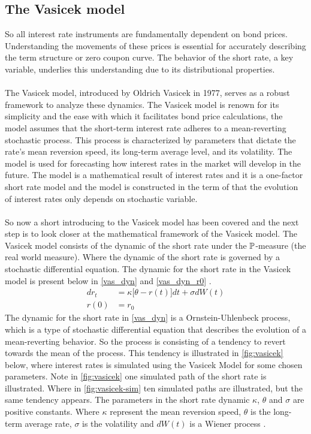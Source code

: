 \subsection{The Vasicek model}
So all interest rate instruments are fundamentally dependent on bond prices. Understanding the movements of 
these prices is essential for accurately describing the term structure or zero coupon curve. The behavior 
of the short rate, a key variable, underlies this understanding due to its distributional properties.
\\\\
The Vasicek model, introduced by Oldrich Vasicek in 1977, serves as a robust framework to analyze these dynamics.
The Vasicek model is renown for its simplicity and the ease with which it facilitates bond price calculations, 
the model assumes that the short-term interest rate adheres to a mean-reverting stochastic process. This process is characterized 
by parameters that dictate the rate's mean reversion speed, its long-term average level, and its volatility.
The model is used for forecasting how interest rates in the market will develop in the future. The model is a
mathematical result of interest rates and it is a one-factor short rate model and the model is constructed in the 
term of that the evolution of interest rates only depends on stochastic variable.
\\\\
So now a short introducing to the Vasicek model has been covered and the next step is to look closer at the 
mathematical framework of the Vasicek model. The Vasicek model consists of the dynamic of the short rate under the $\mathbb{P}$-measure
(the real world measure). Where the dynamic of the short rate is governed by a stochastic differential equation. 
The dynamic for the short rate in the Vasicek model is present below in \autoref{vas_dyn} and \autoref{vas_dyn_r0} \cite{Bjork}.
\begin{align}
    d r_t &= \kappa \Big[\theta -r(t)\Big] dt + \sigma d W(t) \label{vas_dyn}\\
    r(0) &= r_0 \label{vas_dyn_r0}
\end{align}
The dynamic for the short rate in \autoref{vas_dyn} is a Ornstein-Uhlenbeck process, which is a type of stochastic 
differential equation that describes the evolution of a mean-reverting behavior. So the process is consisting of a 
tendency to revert towards the mean of the process. This tendency is illustrated in \autoref{fig:vasicek} below, where 
interest rates is simulated using the Vasicek Model for some chosen parameters. Note in \autoref{fig:vasicek}
one simulated path of the short rate is illustrated. Where in \autoref{fig:vasicek-sim} ten simulated paths are illustrated,
but the same tendency appears. The parameters in the short rate dynamic
$\kappa$, $\theta$ and $\sigma$ are positive constants. Where $\kappa$ represent the mean reversion speed, $\theta$ 
is the long-term average rate, $\sigma$ is the volatility  and $dW(t)$ is a Wiener process \cite{Bermudan}. 

